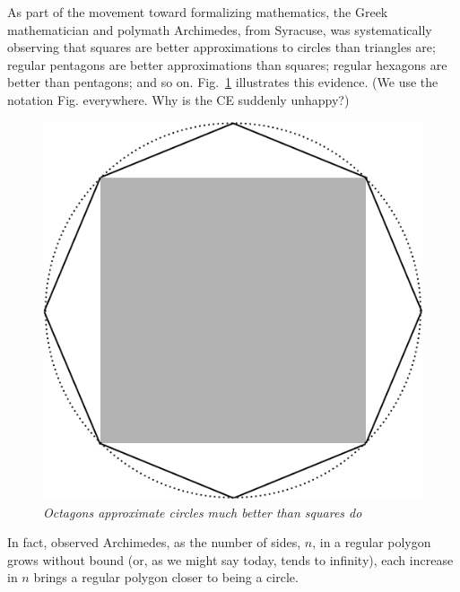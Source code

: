 As part of the movement toward formalizing mathematics, the Greek mathematician and polymath Archimedes, from Syracuse, was systematically observing that squares are better approximations to circles than triangles are; regular pentagons are better approximations than squares; regular hexagons are better than pentagons; and so on.  Fig.~\ref{fig:approxcircle} illustrates this evidence. {\Arny (We use the notation Fig. everywhere.  Why is the CE suddenly unhappy?)}
\begin{figure}[htb]
\begin{center}
       \includegraphics[scale=0.25]{FiguresArithmetic/ApproxCircle}
\caption{{\it Octagons approximate circles much better than squares do}
\label{fig:approxcircle}}
\end{center}
\end{figure}
In fact, observed Archimedes, as the number of sides, $n$, in a regular polygon grows without bound (or, as we might say today, tends to infinity), each increase in $n$ brings a regular polygon closer to being a circle.

\medskip


